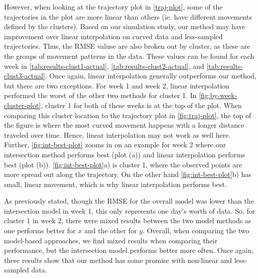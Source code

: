 \documentclass[12pt]{article}
\begin{document}
However, when looking at the trajectory plot in \cref{traj-plot}, some
of the trajectories in the plot are more linear than others (ie. have
different movements defined by the clusters). Based on our simulation
study, our method may have improvement over linear interpolation on
curved data and less-sampled trajectories. Thus, the RMSE valuse are
also broken out by cluster, as these are the groups of movement patterns
in the data. These values can be found for each week in
\cref{tab:results-clust1-actual}, \cref{tab:results-clust2-actual}, and
\cref{tab:results-clust3-actual}. Once again, linear interpolation
generally outperforms our method, but there are two exceptions. For week
1 and week 2, linear interpolation performed the worst of the other two
methods for cluster 1. In \cref{fig:by-week-cluster-plot}, cluster 1 for
both of these weeks is at the top of the plot. When comparing this
cluster location to the trajectory plot in \cref{fig:traj-plot}, the top
of the figure is where the most curved movement happens with a longer
distance traveled over time. Hence, linear interpolation may not work as
well here. Further, \cref{fig:int-best-plot} zooms in on an example for
week 2 where our intersection method performs best (plot (a)) and linear
interpolation performs best (plot (b)). \cref{fig:int-best-plot}a) is
cluster 1, where the observed points are more spread out along the
trajectory. On the other hand \cref{fig:int-best-plot}b) has small,
linear movement, which is why linear interpolation performs best.

As previously stated, though the RMSE for the overall model was lower
than the intersection model in week 1, this only represents one day's
worth of data. So, for cluster 1 in week 2, there were mixed results
between the two model methods as one performs better for \(x\) and the
other for \(y\). Overall, when comparing the two model-based approaches,
we find mixed results when comparing their performance, but the
intersection model performs better more often. Once again, these results
show that our method has some promise with non-linear and less-sampled
data.
\end{document}
